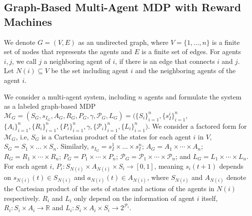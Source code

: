 \documentclass[conf]{new-aiaa}
\begin{document}
\subsection{Graph-Based Multi-Agent MDP with Reward Machines}

We denote $G = (V, E)$ as an undirected graph, where $V =\{1, \dots, n \}$ is a finite set of nodes that represents the agents and $E$ is a finite set of edges. For agents $i, j$, we call $j$ a neighboring agent of $i$, if there is an edge that connects $i$ and $j$. Let $N(i) \subseteq V$ be the set including agent $i$ and the neighboring agents of the agent $i$.

We consider a multi-agent system, including $n$ agents and formulate the system as a labeled graph-based MDP $\mathcal{M}_G = (S_G, s_{I_G}, A_G, R_G, P_G, \gamma, \mathcal{P}_G, L_G) = (\{S_i\}_{i=1}^n, \{s_I^i\}_{i=1}^n,$ $ \{A_i\}_{i=1}^n, \{R_i\}_{i=1}^n, \{P_i\}_{i=1}^n, \gamma, \{\mathcal{P}_i\}_{i=1}^n,
\{L_i\}_{i=1}^n)$. We consider a factored form for $\mathcal{M}_G$, i.e, $S_G$ is a Cartesian product of the states for each agent $i$ in $V$, $S_G = S_1 \times \dots \times S_n$. Similarly, $s_{I_G} = s_I^1 \times \dots \times s_I^n$; $A_G = A_1 \times \cdots \times A_n$; $R_G = R_1 \times \cdots \times R_n$; $P_G = P_1 \times \cdots \times P_n$; $\mathcal{P}_G = \mathcal{P}_1 \times \cdots \times \mathcal{P}_n$; and $L_G = L_1 \times \cdots \times L_n$. For each agent $i$, $P_i: S_{N(i)} \times A_{N(i)} \times S_i \to [0, 1]$, meaning $s_i(t+1)$ depends on $s_{N(i)}(t) \in S_{N(i)}$ and $a_{N(i)}(t) \in A_{N(i)}$, where $S_{N(i)}$ and $A_{N(i)}$ denote the Cartesian product of the sets of states and actions of the agents in $N(i)$ respectively. $R_i$ and $L_i$ only depend on the information of agent $i$ itself, $R_i: S_i \times A_i \to \mathbb{R}$ and $L_i: S_i \times A_i \times S_i \to 2^{\mathcal{P}_i}$. 
\end{document}
